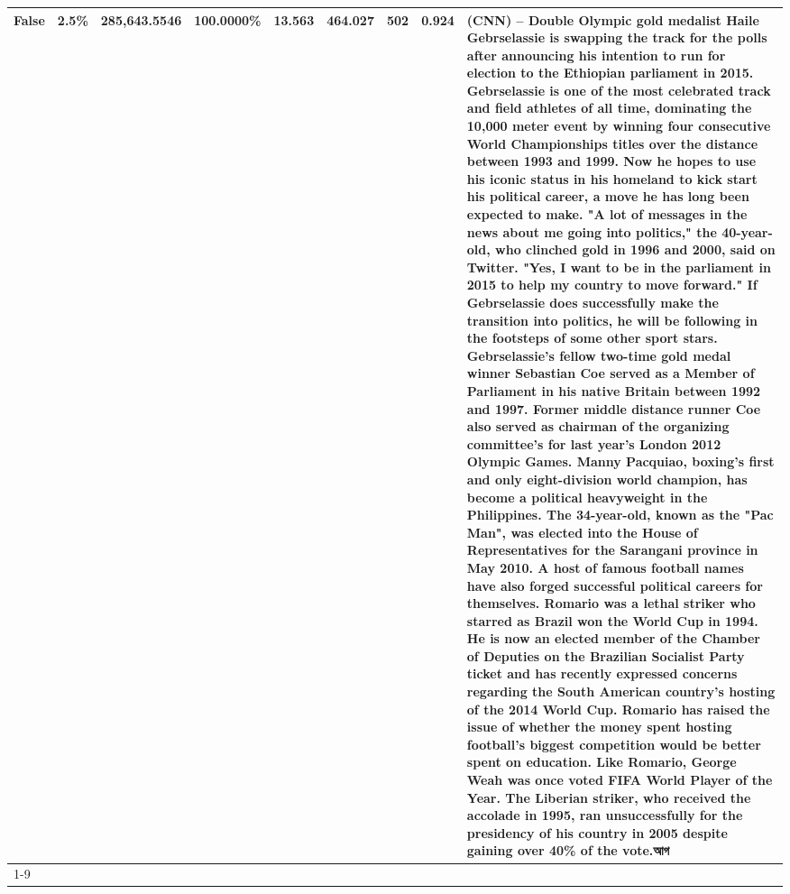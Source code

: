 \begin{table}[H]
{\begin{tabular}{lllrlllll}
False & 2.5\% & 285,643.5546 & \bfseries \color{red} 100.0000\% & 13.563 & 464.027 & 502 & 0.924 & (CNN) -- Double Olympic gold medalist Haile Gebrselassie is swapping the track for the polls after announcing his intention to run for election to the Ethiopian parliament in 2015. Gebrselassie is one of the most celebrated track and field athletes of all time, dominating the 10,000 meter event by winning four consecutive World Championships titles over the distance between 1993 and 1999. Now he hopes to use his iconic status in his homeland to kick start his political career, a move he has long been expected to make. "A lot of messages in the news about me going into politics," the 40-year-old, who clinched gold in 1996 and 2000, said on Twitter. "Yes, I want to be in the parliament in 2015 to help my country to move forward." If Gebrselassie does successfully make the transition into politics, he will be following in the footsteps of some other sport stars. Gebrselassie's fellow two-time gold medal winner Sebastian Coe served as a Member of Parliament in his native Britain between 1992 and 1997. Former middle distance runner Coe also served as chairman of the organizing committee's for last year's London 2012 Olympic Games. Manny Pacquiao, boxing's first and only eight-division world champion, has become a political heavyweight in the Philippines. The 34-year-old, known as the "Pac Man", was elected into the House of Representatives for the Sarangani province in May 2010. A host of famous football names have also forged successful political careers for themselves. Romario was a lethal striker who starred as Brazil won the World Cup in 1994. He is now an elected member of the Chamber of Deputies on the Brazilian Socialist Party ticket and has recently expressed concerns regarding the South American country's hosting of the 2014 World Cup. Romario has raised the issue of whether the money spent hosting football's biggest competition would be better spent on education. Like Romario, George Weah was once voted FIFA World Player of the Year. The Liberian striker, who received the accolade in 1995, ran unsuccessfully for the presidency of his country in 2005 despite gaining over 40\% of the vote.আগ \\
\cline{1-9}

\end{tabular}}
\end{table}
